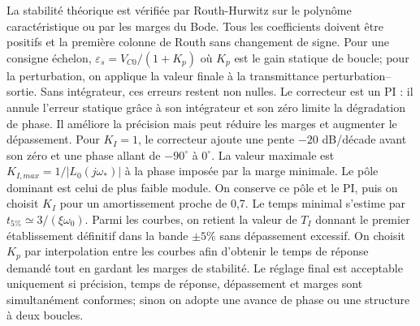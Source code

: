 \begin{corrigebox}
La stabilité théorique est vérifiée par Routh-Hurwitz sur le polynôme
            caractéristique ou par les marges du Bode. Tous les coefficients doivent être
            positifs et la première colonne de Routh sans changement de signe.
Pour une consigne échelon, $\varepsilon_s=V_{C0}/(1+K_p)$ où $K_p$ est le
            gain statique de boucle; pour la perturbation, on applique la valeur finale à
            la transmittance perturbation--sortie. Sans intégrateur, ces erreurs restent
            non nulles.
Le correcteur est un PI : il annule l'erreur statique grâce à son
            intégrateur et son zéro limite la dégradation de phase. Il améliore la
            précision mais peut réduire les marges et augmenter le dépassement.
Pour $K_I=1$, le correcteur ajoute une pente $-20$ dB/décade avant son
            zéro et une phase allant de $-90^\circ$ à $0^\circ$. La valeur maximale est
            $K_{I,max}=1/|L_0(j\omega_*)|$ à la phase imposée par la marge minimale.
Le pôle dominant est celui de plus faible module. On conserve ce pôle et
            le PI, puis on choisit $K_I$ pour un amortissement proche de 0,7. Le temps
            minimal s'estime par $t_{5\%}\simeq3/(\xi\omega_0)$.
Parmi les courbes, on retient la valeur de $T_I$ donnant le premier
            établissement définitif dans la bande $\pm5\%$ sans dépassement excessif.
On choisit $K_p$ par interpolation entre les courbes afin d'obtenir le
            temps de réponse demandé tout en gardant les marges de stabilité.
Le réglage final est acceptable uniquement si précision, temps de réponse,
            dépassement et marges sont simultanément conformes; sinon on adopte une avance
            de phase ou une structure à deux boucles.
\end{corrigebox}
